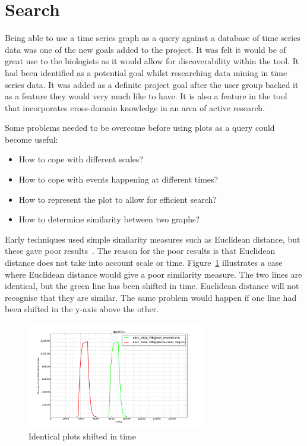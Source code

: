 \section{Search}
\label{sec:search}

Being able to use a time series graph as a query against a database of time series data was one of the new goals added to the project.  It was felt it would be of great use to the biologists as it would allow for discoverability within the tool.  It had been identified as a potential goal whilst researching data mining in time series data.  It was added as a definite project goal after the user group backed it as a feature they would very much like to have.  It is also a feature in the tool that incorporates cross-domain knowledge in an area of active research.


Some problems needed to be overcome before using plots as a query could become useful:
\begin{itemize}
\item How to cope with different scales?
\item How to cope with events happening at different times?
\item How to represent the plot to allow for efficient search?
\item How to determine similarity between two graphs?
\end{itemize}

Early techniques used simple similarity measures such as Euclidean distance, but these gave poor results~\cite{chotirat}.  The reason for the poor results is that Euclidean distance does not take into account scale or time.  Figure~\ref{fig:similar} illustrates a case where Euclidean distance would give a poor similarity measure.  The two lines are identical, but the green line has been shifted in time.  Euclidean distance will not recognise that they are similar.  The same problem would happen if one line had been shifted in the y-axis above the other.

\begin{figure}[h!]
    \centering
    \includegraphics[width=0.7\textwidth]{images/similar_plots.png}
    \caption{Identical plots shifted in time}
    \label{fig:similar}
\end{figure}

